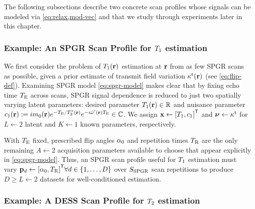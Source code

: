 The following subsections
describe two concrete scan profiles
whose signals can be modeled 
via \eqref{eq:relax,mod-vec} 
and that we study through experiments
later in this chapter.

\subsubsection{Example: An SPGR Scan Profile for $T_1$ estimation}
\label{sss,relax,meth,prof,t1}

We first consider the problem
of $\To\pr$ estimation at $\mathbf{r}$ 
from as few SPGR scans as possible,
given a prior estimate
of transmit field variation $\stx\pr$
(see \eqref{eq:flip-def}).
Examining SPGR model \eqref{eq:spgr-model}
makes clear that 
by fixing echo time $T_\mathrm{E}$ across scans, 
SPGR signal dependence is reduced 
to just two spatially varying latent parameters:
desired parameter $\To\pr \in \real$ and 
nuisance parameter 
$\const{1}\pr := i\mzero\pr e^{-\TE/\Tts\pr} e^{-i\ompmed\pr \TE} \in \complex$.
We assign $\bmx \gets \brac{\To, \const{1}}\tpose$ and $\boldsymbol{\nu} \gets \kappa^{\mathrm{t}}$
for $L \gets 2$ latent 
and $K \gets 1$ known parameters, respectively.

With $T_\mathrm{E}$ fixed, 
prescribed flip angles $\alpha_0$ 
and repetition times $T_\mathrm{R}$ 
are the only remaining $A \gets 2$ 
acquisition parameters
available to choose
that appear explicitly in \eqref{eq:spgr-model}.
Thus, an SPGR scan profile 
useful for $T_1$ estimation 
must vary 
$\bmp_d \gets \brac{\flipnom, \TR}\tpose
\forall d \in \set{1,\dots,D}$
over $S_{\mathrm{SPGR}}$ scan repetitions
to produce $D \geq L \gets 2$ datasets
for well-conditioned estimation.

\subsubsection{Example: A DESS Scan Profile for $T_2$ estimation}
\label{sss,relax,meth,prof,t2}

